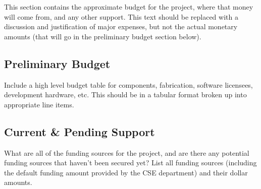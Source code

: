 This section contains the approximate budget for the project, where that money will come from, and any other support. This text should be replaced with a discussion and justification of major expenses, but not the actual monetary amounts (that will go in the preliminary budget section below). 

\subsection{Preliminary Budget}
Include a high level budget table for components, fabrication, software licensees, development hardware, etc. This should be in a tabular format broken up into appropriate line items. 

\subsection{Current \& Pending Support}
What are all of the funding sources for the project, and are there any potential funding sources that haven't been secured yet? List all funding sources (including the default funding amount provided by the CSE department) and their dollar amounts.